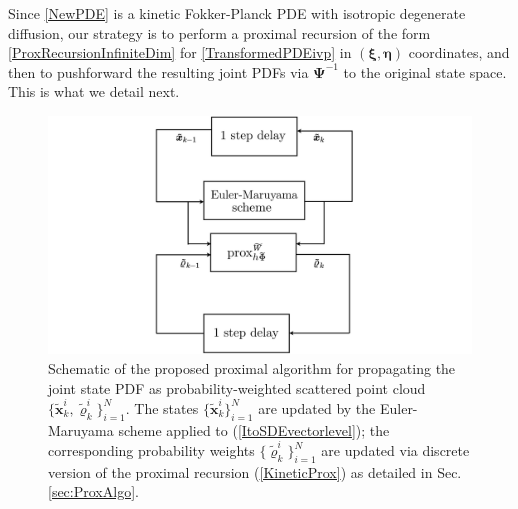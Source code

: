 \documentclass[10pt,twocolumn]{IEEEtran}
\begin{document}
Since \eqref{NewPDE} is a kinetic Fokker-Planck PDE with isotropic degenerate diffusion, our strategy is to perform a proximal recursion of the form \eqref{ProxRecursionInfiniteDim} for \eqref{TransformedPDEivp} in $(\bm{\xi},\bm{\eta})$ coordinates, and then to pushforward the resulting joint PDFs via $\bm{\Psi}^{-1}$ to the original state space. This is what we detail next.






\begin{figure}[t]
\centering
\includegraphics[width=.7\linewidth]{BlockDiagm.pdf}
\caption{\small{Schematic of the proposed proximal algorithm for propagating the joint state PDF as probability-weighted scattered point cloud $\{\tilde{\bm{x}}_{k}^{i},\tilde{\varrho}_{k}^{i}\}_{i=1}^{N}$. The states $\{\tilde{\bm{x}}_{k}^{i}\}_{i=1}^{N}$ are updated by the Euler-Maruyama scheme applied to (\ref{ItoSDEvectorlevel}); the corresponding probability weights $\{\tilde{\varrho}_{k}^{i}\}_{i=1}^{N}$ are updated via discrete version of the proximal recursion (\ref{KineticProx}) as detailed in Sec. \ref{sec:ProxAlgo}.}}
\label{fig:BlockDiagm}
\vspace*{-0.2in}
\end{figure}
\end{document}
